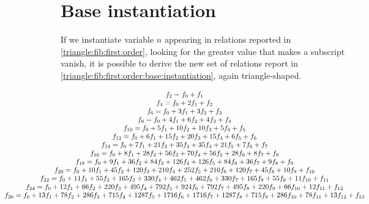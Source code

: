 \section{Base instantiation}

If we instantiate variable $n$ appearing in relations reported in
\autoref{triangle:fib:first:order}, looking for the greater value
that makes a subscript vanish, it is possible to derive the 
new set of relations report in \autoref{triangle:fib:first:order:base:instantiation},
again triangle-shaped.

\begin{equation}
    \hspace{-3cm}
    \begin{array}{c}
        f_{2} = f_{0} + f_{1}\\
        f_{4} = f_{0} + 2 f_{1} + f_{2}\\
        f_{6} = f_{0} + 3 f_{1} + 3 f_{2} + f_{3}\\
        f_{8} = f_{0} + 4 f_{1} + 6 f_{2} + 4 f_{3} + f_{4}\\
        f_{10} = f_{0} + 5 f_{1} + 10 f_{2} + 10 f_{3} + 5 f_{4} + f_{5}\\
        f_{12} = f_{0} + 6 f_{1} + 15 f_{2} + 20 f_{3} + 15 f_{4} + 6 f_{5} + f_{6}\\
        f_{14} = f_{0} + 7 f_{1} + 21 f_{2} + 35 f_{3} + 35 f_{4} + 21 f_{5} + 7 f_{6} + f_{7}\\
        f_{16} = f_{0} + 8 f_{1} + 28 f_{2} + 56 f_{3} + 70 f_{4} + 56 f_{5} + 28 f_{6} + 8 f_{7} + f_{8}\\
        f_{18} = f_{0} + 9 f_{1} + 36 f_{2} + 84 f_{3} + 126 f_{4} + 126 f_{5} + 84 f_{6} + 36 f_{7} + 9 f_{8} + f_{9}\\
        f_{20} = f_{0} + 10 f_{1} + 45 f_{2} + 120 f_{3} + 210 f_{4} + 252 f_{5} + 210 f_{6} + 120 f_{7} + 45 f_{8} + 10 f_{9} + f_{10}\\
        f_{22} = f_{0} + 11 f_{1} + 55 f_{2} + 165 f_{3} + 330 f_{4} + 462 f_{5} + 462 f_{6} + 330 f_{7} + 165 f_{8} + 55 f_{9} + 11 f_{10} + f_{11}\\
        f_{24} = f_{0} + 12 f_{1} + 66 f_{2} + 220 f_{3} + 495 f_{4} + 792 f_{5} + 924 f_{6} + 792 f_{7} + 495 f_{8} + 220 f_{9} + 66 f_{10} + 12 f_{11} + f_{12}\\
        f_{26} = f_{0} + 13 f_{1} + 78 f_{2} + 286 f_{3} + 715 f_{4} + 1287 f_{5} + 1716 f_{6} + 1716 f_{7} + 1287 f_{8} + 715 f_{9} + 286 f_{10} + 78 f_{11} + 13 f_{12} + f_{13}\\
    \end{array}
    \label{triangle:fib:first:order:base:instantiation}
\end{equation}

